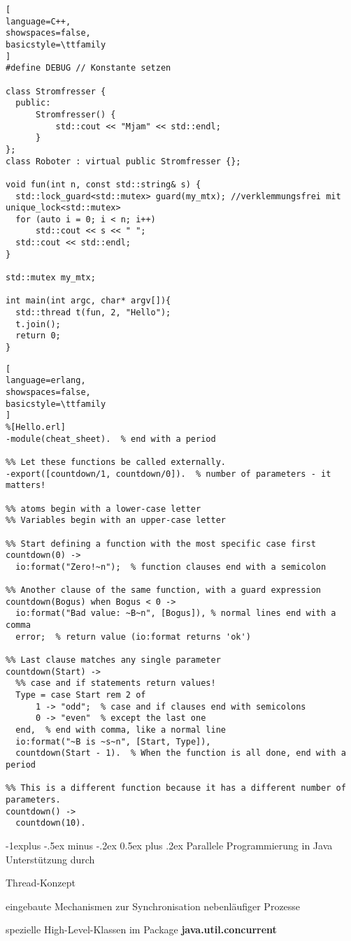 \documentclass[10pt]{article}
\makeatletter
\renewcommand{\subsection}{\@startsection{subsection}{2}{0mm}%
                                {-1explus -.5ex minus -.2ex}%
                                {0.5ex plus .2ex}%
                                {\normalfont\normalsize\bfseries}}
\makeatother
\begin{document}
\begin{itemize*}
\begin{lstlisting}[
language=C++,
showspaces=false,
basicstyle=\ttfamily
]
#define DEBUG // Konstante setzen

class Stromfresser {
  public:
      Stromfresser() {
          std::cout << "Mjam" << std::endl;
      }
};
class Roboter : virtual public Stromfresser {};

void fun(int n, const std::string& s) {
  std::lock_guard<std::mutex> guard(my_mtx); //verklemmungsfrei mit unique_lock<std::mutex>
  for (auto i = 0; i < n; i++)
      std::cout << s << " ";
  std::cout << std::endl;
}

std::mutex my_mtx;

int main(int argc, char* argv[]){
  std::thread t(fun, 2, "Hello");
  t.join();
  return 0;
}
\end{lstlisting}
\hfill

\begin{lstlisting}[
language=erlang,
showspaces=false,
basicstyle=\ttfamily
]
%[Hello.erl]
-module(cheat_sheet).  % end with a period

%% Let these functions be called externally.
-export([countdown/1, countdown/0]).  % number of parameters - it matters!

%% atoms begin with a lower-case letter
%% Variables begin with an upper-case letter

%% Start defining a function with the most specific case first
countdown(0) ->  
  io:format("Zero!~n");  % function clauses end with a semicolon

%% Another clause of the same function, with a guard expression
countdown(Bogus) when Bogus < 0 ->
  io:format("Bad value: ~B~n", [Bogus]), % normal lines end with a comma
  error;  % return value (io:format returns 'ok')
  
%% Last clause matches any single parameter
countdown(Start) ->
  %% case and if statements return values!
  Type = case Start rem 2 of
      1 -> "odd";  % case and if clauses end with semicolons
      0 -> "even"  % except the last one
  end,  % end with comma, like a normal line
  io:format("~B is ~s~n", [Start, Type]), 
  countdown(Start - 1).  % When the function is all done, end with a period

%% This is a different function because it has a different number of parameters.
countdown() ->
  countdown(10).

\end{lstlisting}
\hfill


\subsection{Parallele Programmierung in Java}
Unterstützung durch
\begin{itemize*}
  \item Thread-Konzept
  \item eingebaute Mechanismen zur Synchronisation nebenläufiger Prozesse
  \item spezielle High-Level-Klassen im Package
  \newline \textbf{java.util.concurrent}
\end{itemize*}

\end{itemize*}
\end{document}
